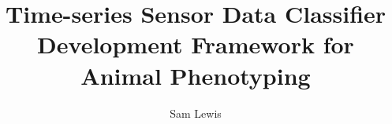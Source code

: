 \makeatletter
\title{Time-series Sensor Data Classifier Development Framework for Animal Phenotyping} \let\Title\@title
\author{Sam Lewis} \let\Author\@author
{}  %
\makeatother

\renewcommand{\degreetext}{in partial fulfilment of the Degree Bachelor of Engineering  \\ in the discipline of Electrical Engineering}

\titlepage





\tableofcontents
\listoffigures


